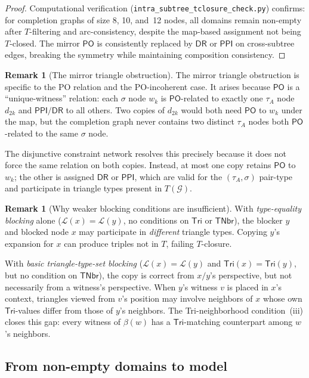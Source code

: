 \documentclass[a4paper,11pt]{article}
\theoremstyle{definition}
\newtheorem{remark}[theorem]{Remark}
\newcommand{\DR}{\ensuremath{\mathsf{DR}}}
\newcommand{\PO}{\ensuremath{\mathsf{PO}}}
\newcommand{\PPI}{\ensuremath{\mathsf{PPI}}}
\newcommand{\Tri}{\ensuremath{\mathsf{Tri}}}
\newcommand{\TNbr}{\ensuremath{\mathsf{TNbr}}}
\newcommand{\GG}{\ensuremath{\mathcal{G}}}
\newcommand{\LL}{\ensuremath{\mathcal{L}}}
\begin{document}
\begin{proof}
Computational verification (\texttt{intra\_subtree\_tclosure\_check.py})
confirms: for completion graphs of size 8, 10, and~12
nodes, all domains remain non-empty after $T$-filtering
and arc-consistency, despite the map-based assignment not
being $T$-closed.  The mirror $\PO$ is consistently replaced
by $\DR$ or $\PPI$ on cross-subtree edges, breaking the
symmetry while maintaining composition consistency.
\end{proof}

\begin{remark}[The mirror triangle obstruction]
\label{rem:mirror}
The mirror triangle obstruction is specific to the PO
relation and the PO-incoherent case.  It arises because
$\PO$ is a ``unique-witness'' relation: each $\sigma$ node
$w_k$ is $\PO$-related to exactly one $\tau_A$ node $d_{2k}$
and $\PPI/\DR$ to all others.  Two copies of $d_{2k}$ would
both need $\PO$ to $w_k$ under the map, but the completion
graph never contains two distinct $\tau_A$ nodes both
$\PO$-related to the same $\sigma$ node.

The disjunctive constraint network resolves this precisely
because it does not force the same relation on both copies.
Instead, at most one copy retains $\PO$ to $w_k$; the other
is assigned $\DR$ or $\PPI$, which are valid for the
$(\tau_A, \sigma)$ pair-type and participate in triangle
types present in $T(\GG)$.
\end{remark}

\begin{remark}[Why weaker blocking conditions are insufficient]
\label{rem:type-eq-fail}
With \emph{type-equality blocking} alone ($\LL(x) = \LL(y)$,
no conditions on $\Tri$ or $\TNbr$), the blocker $y$ and
blocked node $x$ may participate in \emph{different} triangle
types.  Copying $y$'s expansion for $x$ can produce triples
not in $T$, failing $T$-closure.

With \emph{basic triangle-type-set blocking} ($\LL(x) = \LL(y)$
and $\Tri(x) = \Tri(y)$, but no condition on $\TNbr$), the
copy is correct from $x/y$'s perspective, but not necessarily
from a witness's perspective.  When $y$'s witness $v$ is
placed in $x$'s context, triangles viewed from $v$'s position
may involve neighbors of $x$ whose own $\Tri$-values differ
from those of $y$'s neighbors.  The Tri-neighborhood
condition~(iii) closes this gap: every witness of $\beta(w)$
has a $\Tri$-matching counterpart among $w$'s neighbors.
\end{remark}

\subsection{From non-empty domains to model}
\end{document}
